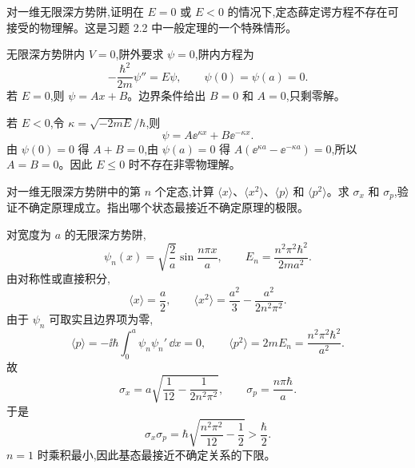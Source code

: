 \begin{question}
对一维无限深方势阱,证明在 $E=0$ 或 $E<0$ 的情况下,定态薛定谔方程不存在可接受的物理解。这是习题 2.2 中一般定理的一个特殊情形。
\begin{solution}
无限深方势阱内 $V=0$,阱外要求 $\psi=0$,阱内方程为
\[
-\frac{\hbar^2}{2m}\psi''=E\psi,
\qquad \psi(0)=\psi(a)=0.
\]
若 $E=0$,则 $\psi=Ax+B$。边界条件给出 $B=0$ 和 $A=0$,只剩零解。

若 $E<0$,令 $\kappa=\sqrt{-2mE}/\hbar$,则
\[
\psi=A\ee^{\kappa x}+B\ee^{-\kappa x}.
\]
由 $\psi(0)=0$ 得 $A+B=0$,由 $\psi(a)=0$ 得 $A(\ee^{\kappa a}-\ee^{-\kappa a})=0$,所以 $A=B=0$。因此 $E\le0$ 时不存在非零物理解。
\end{solution}
\end{question}

\begin{question}
对一维无限深方势阱中的第 $n$ 个定态,计算 $\langle x\rangle$、$\langle x^2\rangle$、$\langle p\rangle$ 和 $\langle p^2\rangle$。求 $\sigma_x$ 和 $\sigma_p$,验证不确定原理成立。指出哪个状态最接近不确定原理的极限。
\begin{solution}
对宽度为 $a$ 的无限深方势阱,
\[
\psi_n(x)=\sqrt{\frac2a}\sin\frac{n\pi x}{a},\qquad
E_n=\frac{n^2\pi^2\hbar^2}{2ma^2}.
\]
由对称性或直接积分,
\[
\langle x\rangle=\frac a2,
\qquad
\langle x^2\rangle=\frac{a^2}{3}-\frac{a^2}{2n^2\pi^2}.
\]
由于 $\psi_n$ 可取实且边界项为零,
\[
\langle p\rangle=-\ii\hbar\int_0^a\psi_n\psi_n'\,\dd x=0,
\qquad
\langle p^2\rangle=2mE_n=\frac{n^2\pi^2\hbar^2}{a^2}.
\]
故
\[
\sigma_x=a\sqrt{\frac1{12}-\frac1{2n^2\pi^2}},
\qquad
\sigma_p=\frac{n\pi\hbar}{a}.
\]
于是
\[
\sigma_x\sigma_p
=\hbar\sqrt{\frac{n^2\pi^2}{12}-\frac12}>\frac{\hbar}{2}.
\]
$n=1$ 时乘积最小,因此基态最接近不确定关系的下限。
\end{solution}
\end{question}

